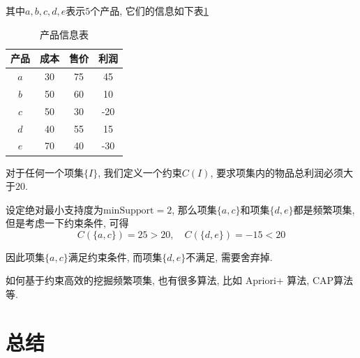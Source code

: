 \documentclass[a4paper,UTF8]{ctexart}
\theoremstyle{plain} \newtheorem{theorem}{定理}[section]
\theoremstyle{plain} \newtheorem{definition}{定义}[section]
\theoremstyle{plain} \newtheorem{lemma}{引理}[section]
\theoremstyle{plain} \newtheorem{proposition}{命题}[section]
\theoremstyle{plain} \newtheorem{example}{例}[section]
\theoremstyle{plain} \newtheorem{remark}{注}[section]
\theoremstyle{plain} \newtheorem{corollary}{推论}[section]
\begin{document}
其中$a, b, c, d, e$表示$5$个产品, 它们的信息如下表\ref{profit}
\begin{table}[!htb]
\centering
\caption{产品信息表}
\label{profit}
\begin{tabular}{cccc}
	\hline
    \textbf{产品} & \textbf{成本} & \textbf{售价} & \textbf{利润} \\
    \hline
    $a$   &  30  &  75  & 45 \\
    \hline
    $b$   &  50  &  60  & 10 \\
    \hline
    $c$   &  50  &  30  & -20 \\
    \hline
    $d$   &  40  &  55  & 15 \\
    \hline
    $e$   &  70  &  40  & -30 \\
	\hline
\end{tabular}
\end{table}

对于任何一个项集$\{I\}$, 我们定义一个约束$C(I)$, 要求项集内的物品总利润必须大于$20$.

设定绝对最小支持度为$\mathrm{minSupport} = 2$, 那么项集$\{a, c\}$和项集$\{d, e\}$都是频繁项集, 但是考虑一下约束条件, 可得
\begin{equation*}
C(\{a, c\}) = 25 > 20, \quad C(\{d, e\}) = -15 < 20
\end{equation*}

因此项集$\{a, c\}$满足约束条件, 而项集$\{d, e\}$不满足, 需要舍弃掉.

如何基于约束高效的挖掘频繁项集, 也有很多算法, 比如 Apriori+ 算法, CAP算法等.





\section{总结}
\end{document}
